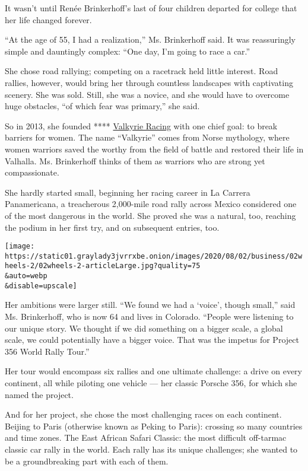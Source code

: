 It wasn't until Renée Brinkerhoff's last of four children departed for
college that her life changed forever.

``At the age of 55, I had a realization,'' Ms. Brinkerhoff said. It was
reassuringly simple and dauntingly complex: ``One day, I'm going to race
a car.''

She chose road rallying; competing on a racetrack held little interest.
Road rallies, however, would bring her through countless landscapes with
captivating scenery. She was sold. Still, she was a novice, and she
would have to overcome huge obstacles, ``of which fear was primary,''
she said.

So in 2013, she founded ****
\href{https://www.valkyrieracing.com/}{Valkyrie Racing} with one chief
goal: to break barriers for women. The name ``Valkyrie'' comes from
Norse mythology, where women warriors saved the worthy from the field of
battle and restored their life in Valhalla. Ms. Brinkerhoff thinks of
them as warriors who are strong yet compassionate.

She hardly started small, beginning her racing career in La Carrera
Panamericana, a treacherous 2,000-mile road rally across Mexico
considered one of the most dangerous in the world. She proved she was a
natural, too, reaching the podium in her first try, and on subsequent
entries, too.

\texttt{[image: https://static01.graylady3jvrrxbe.onion/images/2020/08/02/business/02wheels-2/02wheels-2-articleLarge.jpg?quality=75\\\&auto=webp\\\&disable=upscale]}

Her ambitions were larger still. ``We found we had a `voice', though
small,'' said Ms. Brinkerhoff, who is now 64 and lives in Colorado.
``People were listening to our unique story. We thought if we did
something on a bigger scale, a global scale, we could potentially have a
bigger voice. That was the impetus for Project 356 World Rally Tour.''

Her tour would encompass six rallies and one ultimate challenge: a drive
on every continent, all while piloting one vehicle --- her classic
Porsche 356, for which she named the project.

And for her project, she chose the most challenging races on each
continent. Beijing to Paris (otherwise known as Peking to Paris):
crossing so many countries and time zones. The East African Safari
Classic: the most difficult off-tarmac classic car rally in the world.
Each rally has its unique challenges; she wanted to be a groundbreaking
part with each of them.

